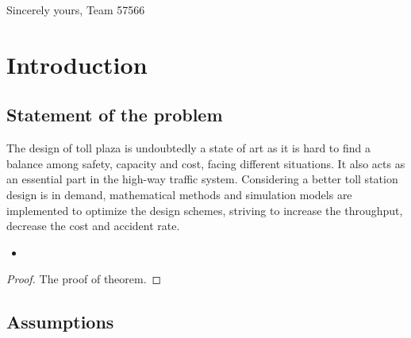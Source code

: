 \documentclass{mcmthesis}
\begin{document}
Sincerely yours,
Team 57566

\section{Introduction}

\subsection{Statement of the problem}

The design of toll plaza is undoubtedly a state of art as it is hard to find a balance among safety, capacity and cost, facing different situations. It also acts as an essential part in the high-way traffic system. Considering a better toll station design is in demand, mathematical methods and simulation models are implemented to optimize the design schemes, striving to increase the throughput, decrease the cost and accident rate.



\begin{itemize}

\item 
\end{itemize}







\begin{Theorem} \label{thm:latex}

\end{Theorem}

\begin{Lemma} \label{thm:tex}

\end{Lemma}

\begin{proof}
The proof of theorem.
\end{proof}

\subsection{Assumptions}
\end{document}
